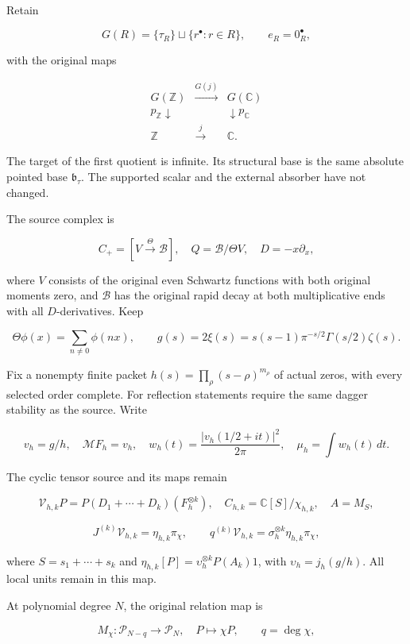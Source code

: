 Retain

\[
G(R)=\{\tau_R\}\sqcup\{r^\bullet:r\in R\},\qquad e_R=0_R^\bullet,
\]

with the original maps

\[
\begin{array}{ccc}
G(\mathbb Z)&\xrightarrow{G(j)}&G(\mathbb C)\\
p_{\mathbb Z}\downarrow&&\downarrow p_{\mathbb C}\\
\mathbb Z&\xrightarrow{j}&\mathbb C.
\end{array}                                                    \tag{1}
\]

The target of the first quotient is infinite. Its structural base is the same absolute pointed base
\(\mathfrak b_\tau\). The supported scalar and the external absorber have not changed.

The source complex is

\[
C_+=[V\xrightarrow{\Theta}\mathscr B],\quad
Q=\mathscr B/\Theta V,\quad D=-x\partial_x,
\]

where \(V\) consists of the original even Schwartz functions with both original moments zero, and
\(\mathscr B\) has the original rapid decay at both multiplicative ends with all \(D\)-derivatives.
Keep

\[
\Theta\phi(x)=\sum_{n\ne0}\phi(nx),\qquad
 g(s)=2\xi(s)=s(s-1)\pi^{-s/2}\Gamma(s/2)\zeta(s).
\]

Fix a nonempty finite packet \(h(s)=\prod_\rho(s-\rho)^{m_\rho}\) of actual zeros, with every
selected order complete. For reflection statements require the same dagger stability as the source.
Write

\[
v_h=g/h,\quad \mathcal MF_h=v_h,\quad
w_h(t)=\frac{|v_h(1/2+it)|^2}{2\pi},\quad \mu_h=\int w_h(t)\,dt.       \tag{2}
\]

The cyclic tensor source and its maps remain

\[
\mathcal V_{h,k}P=P(D_1+\cdots+D_k)(F_h^{\otimes k}),\quad
C_{h,k}=\mathbb C[S]/\chi_{h,k},\quad A=M_S,
\]

\[
J^{(k)}\mathcal V_{h,k}=\eta_{h,k}\pi_\chi,\qquad
q^{(k)}\mathcal V_{h,k}=\sigma_h^{\otimes k}\eta_{h,k}\pi_\chi,          \tag{3}
\]

where \(S=s_1+\cdots+s_k\) and \(\eta_{h,k}[P]=\upsilon_h^{\otimes k}P(A_k)1\), with
\(\upsilon_h=j_h(g/h)\). All local units remain in this map.

At polynomial degree \(N\), the original relation map is

\[
M_\chi:\mathcal P_{N-q}\longrightarrow\mathcal P_N,\quad P\mapsto\chi P,
\qquad q=\deg\chi,                                                   \tag{4}
\]

